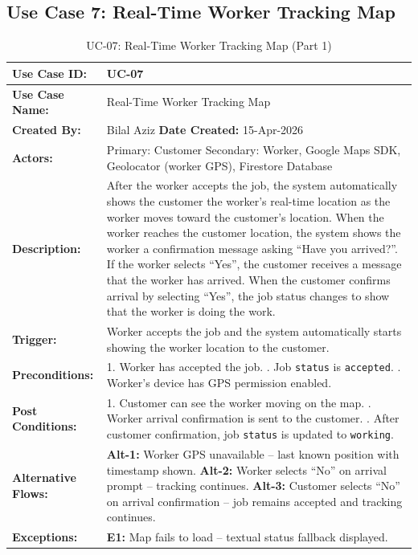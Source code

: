 \newpage

\subsection*{Use Case 7: Real-Time Worker Tracking Map}

{\small
\renewcommand{\arraystretch}{1.05}
\begin{table}[H]
\centering
\begin{tabular}{|p{3cm}|p{11.2cm}|}
\hline
\textbf{Use Case ID:} & UC-07 \\ \hline
\textbf{Use Case Name:} & Real-Time Worker Tracking Map \\ \hline
\textbf{Created By:} & Bilal Aziz \hfill \textbf{Date Created:} 15-Apr-2026 \\ \hline
\textbf{Actors:} & Primary: Customer \quad Secondary: Worker, Google Maps SDK, Geolocator (worker GPS), Firestore Database \\ \hline
\textbf{Description:} & After the worker accepts the job, the system automatically shows the customer the worker's real-time location as the worker moves toward the customer's location. When the worker reaches the customer location, the system shows the worker a confirmation message asking ``Have you arrived?''. If the worker selects ``Yes'', the customer receives a message that the worker has arrived. When the customer confirms arrival by selecting ``Yes'', the job status changes to show that the worker is doing the work. \\ \hline
\textbf{Trigger:} & Worker accepts the job and the system automatically starts showing the worker location to the customer. \\ \hline
\textbf{Preconditions:} & 1. Worker has accepted the job. \newline 2. Job \texttt{status} is \texttt{accepted}. \newline 3. Worker's device has GPS permission enabled. \\ \hline
\textbf{Post Conditions:} & 1. Customer can see the worker moving on the map. \newline 2. Worker arrival confirmation is sent to the customer. \newline 3. After customer confirmation, job \texttt{status} is updated to \texttt{working}. \\ \hline
\textbf{Alternative Flows:} & \textbf{Alt-1:} Worker GPS unavailable -- last known position with timestamp shown. \newline \textbf{Alt-2:} Worker selects ``No'' on arrival prompt -- tracking continues. \newline \textbf{Alt-3:} Customer selects ``No'' on arrival confirmation -- job remains accepted and tracking continues. \\ \hline
\textbf{Exceptions:} & \textbf{E1:} Map fails to load -- textual status fallback displayed. \\ \hline
\end{tabular}
\caption*{UC-07: Real-Time Worker Tracking Map (Part 1)}
\end{table}
}

